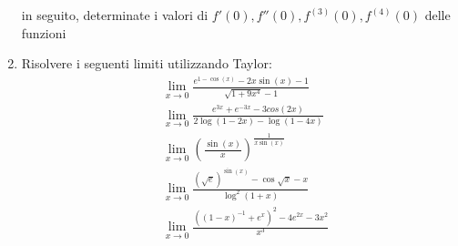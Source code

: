 \begin{enumerate}
	      in seguito, determinate i valori di $ f'\left(0\right), f''\left(0\right), f^{\left(3\right)} \left(0\right), f^{\left(4\right)} \left(0\right) $ delle funzioni
	\item Risolvere i seguenti limiti utilizzando Taylor:
	      \begin{align*}
		       & \lim_{x \to 0} \frac{e^{1 - \cos \left(x\right)} - 2x \sin \left(x\right) -1}{\sqrt{1 + 9x^{4}}-1}                         \\
		       & \lim_{x \to 0} \frac{e^{3x } + e ^{ -3x } - 3cos\left(2x \right)}{ 2 \log \left(1 - 2x \right) - \log \left(1 - 4x\right)} \\
		       & \lim_{x \to 0}  \left(\frac{\sin\left(x\right)}{x}\right)^{\frac{1}{x \sin \left(x\right)}}                                \\
		       & \lim_{x \to 0} \frac{\left(\sqrt{e}\right)^{\sin \left(x\right)} - \cos  \sqrt{x} - x}{ \log ^2  \left(1 + x\right)}       \\
		       & \lim_{x \to 0}  \frac{ \left(\left(1 - x\right) ^{-1} + e ^{x}\right)^2  - 4 e ^{ 2x } - 3x^2 }{x^3 }
	      \end{align*}
\end{enumerate}
